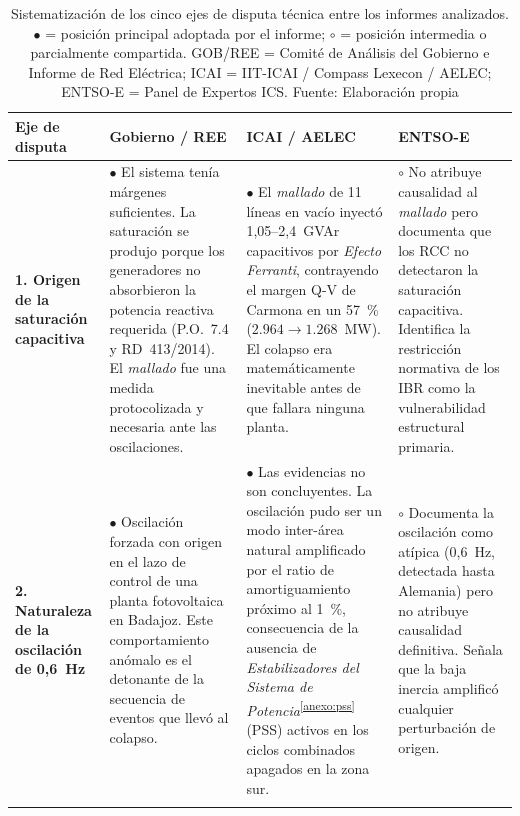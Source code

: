 \begin{landscape}
\begin{table}[H]
\centering
\caption[Divergencias técnicas irreconciliables entre los informes sobre el apagón del 28 de abril.]{%
Sistematización de los cinco ejes de disputa técnica entre los
informes analizados. $\bullet$ = posición principal adoptada por el
informe; $\circ$ = posición intermedia o parcialmente compartida.
GOB/REE = Comité de Análisis del Gobierno e Informe de Red Eléctrica;
ICAI = IIT-ICAI / Compass Lexecon / AELEC; ENTSO-E = Panel de Expertos
ICS. Fuente: Elaboración propia}
\label{tab:discrepancias}
\vspace{0.3cm}
\footnotesize
\setlength{\tabcolsep}{6pt}
\begin{tabular}{p{3.2cm} p{6.5cm} p{6.5cm} p{5.5cm}}
\toprule
\textbf{Eje de disputa}
& \textbf{Gobierno / REE}
& \textbf{ICAI / AELEC}
& \textbf{ENTSO-E} \\
\midrule

\textbf{1. Origen de la saturación capacitiva}
&
$\bullet$ El sistema tenía márgenes suficientes. La saturación se
produjo porque los generadores no absorbieron la potencia reactiva
requerida (P.O.~7.4 y RD~413/2014). El \textit{mallado} fue una medida
protocolizada y necesaria ante las oscilaciones.
&
$\bullet$ El \textit{mallado} de 11 líneas en vacío inyectó
1,05--2,4~GVAr capacitivos por \textit{Efecto Ferranti}, contrayendo
el margen Q-V de Carmona en un 57~\% ($2.964 \to 1.268$~MW). El colapso
era matemáticamente inevitable antes de que fallara ninguna planta.
&
$\circ$ No atribuye causalidad al \textit{mallado} pero documenta
que los RCC no detectaron la saturación capacitiva. Identifica la
restricción normativa de los IBR como la vulnerabilidad estructural
primaria. \\
\addlinespace\midrule

\textbf{2. Naturaleza de la oscilación de 0,6~Hz}
&
$\bullet$ Oscilación forzada con origen en el lazo de control de una
planta fotovoltaica en Badajoz. Este comportamiento anómalo es el
detonante de la secuencia de eventos que llevó al colapso.
&
$\bullet$ Las evidencias no son concluyentes. La oscilación pudo ser
un modo inter-área natural amplificado por el ratio de amortiguamiento
próximo al 1~\%, consecuencia de la ausencia de
\textit{Estabilizadores del Sistema de
Potencia}\textsuperscript{\ref{anexo:pss}} (PSS) activos en los ciclos
combinados apagados en la zona sur.
&
$\circ$ Documenta la oscilación como atípica (0,6~Hz, detectada hasta
Alemania) pero no atribuye causalidad definitiva. Señala que la baja
inercia amplificó cualquier perturbación de origen. \\
\addlinespace\midrule


\end{tabular}
\end{table}
\end{landscape}
